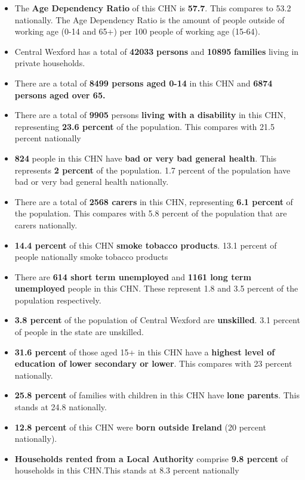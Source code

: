 \documentclass{article}
\begin{document}
\begin{itemize}

\item The \textbf{Age Dependency Ratio} of this CHN is  \textbf{57.7}. This compares to 53.2 nationally. The Age Dependency Ratio is the amount of people outside of working age (0-14 and 65+) per 100 people of working age (15-64). 

\item Central Wexford has a total of \textbf{\num{42033}} \textbf{persons} and  \textbf{\num{10895}} \textbf{families} living in private households.

\item There are a total of \textbf{\num{8499} persons aged 0-14} in this CHN and \textbf{\num{6874} persons aged over 65.} 

\item There are a total of \textbf{\num{9905}} persons \textbf{living with a disability} in this CHN, representing \textbf{23.6 percent} of the population. This compares with  21.5 percent nationally

\item \textbf{\num{824}} people in this CHN have \textbf{bad or very bad general health}. This represents \textbf{2 percent} of the population. 1.7 percent of the population have bad or very bad general health nationally. 

\item There are a total of \textbf{\num{2568} carers} in this CHN, representing \textbf{6.1 percent} of the population. This compares with 5.8 percent of the population that are carers nationally. 

\item \textbf{14.4 percent} of this CHN \textbf{smoke tobacco products}. 13.1 percent of people nationally smoke tobacco products

\item There are \textbf{\num{614} short term unemployed} and \textbf{\num{1161} long term unemployed} people in this CHN. These represent 1.8 and 3.5 percent of the population respectively.

\item  \textbf{3.8 percent} of the population of Central Wexford are \textbf{unskilled}. 3.1 percent of people in the state are unskilled.

\item \textbf{31.6 percent} of those aged 15+ in this CHN have a \textbf{highest level of education of lower secondary or lower}. This compares with 23 percent nationally. 

\item \textbf{25.8 percent} of families with children in this CHN have \textbf{lone parents}. This stands at 24.8 nationally.

\item \textbf{12.8 percent} of this CHN were \textbf{born outside Ireland} (20 percent nationally).

\item \textbf{Households rented from a Local Authority} comprise \textbf{9.8 percent} of households in this CHN.This stands at 8.3 percent nationally

\end{itemize}
\end{document}
